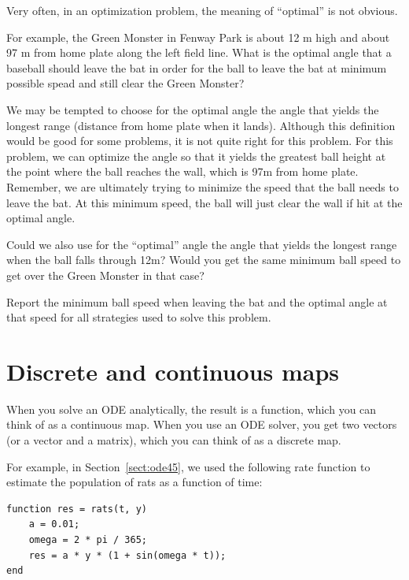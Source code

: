 \documentclass[
]{book}
\begin{document}
\begin{ex}
Very often, in an optimization problem, the meaning of ``optimal'' is not obvious.

For example, the Green Monster in Fenway Park is about 12 m high and about 97
m from home plate along the left field line.
What is the optimal angle that a baseball should leave the bat in order
for the ball 
to leave the bat at minimum possible spead and still clear the Green Monster?

We may be tempted
to choose for the optimal angle the angle that yields the longest
range (distance from home plate when it lands).  
Although this definition would be good for some problems,
it is not quite right for this problem.  
For this problem, we can optimize the angle so that it
yields the greatest ball height at the point where
the ball reaches the wall, which is 97m from home plate.
Remember, we are ultimately trying to minimize
the speed that the ball needs to leave the bat.  At this minimum speed,
the ball will just clear the wall if hit at the optimal angle.

Could we also use for the ``optimal'' angle the 
angle that yields the longest range when the ball falls
through 12m?  Would you get the same minimum ball speed
to get over the Green Monster in that case?

Report the minimum ball speed when leaving the bat and the optimal angle
at that speed for all strategies used to solve this problem.
\end{ex}

\section{Discrete and continuous maps}

When you solve an ODE analytically, the result is a function,
which you can think of as a continuous map.  When you use an
ODE solver, you get two vectors (or a vector and a matrix), which
you can think of as a discrete map.

For example, in Section~\ref{sect:ode45}, we used the following rate
function to estimate the population of rats as a function of time:

\begin{verbatim}
function res = rats(t, y)
    a = 0.01;
    omega = 2 * pi / 365;
    res = a * y * (1 + sin(omega * t));
end
\end{verbatim}
\end{document}
